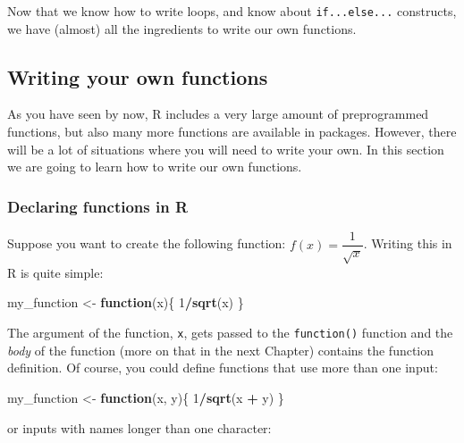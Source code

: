 \documentclass[
]{article}
\newenvironment{Shaded}{\begin{snugshade}}{\end{snugshade}}
\newcommand{\ControlFlowTok}[1]{\textcolor[rgb]{0.13,0.29,0.53}{\textbf{#1}}}
\newcommand{\DecValTok}[1]{\textcolor[rgb]{0.00,0.00,0.81}{#1}}
\newcommand{\KeywordTok}[1]{\textcolor[rgb]{0.13,0.29,0.53}{\textbf{#1}}}
\newcommand{\NormalTok}[1]{#1}
\newcommand{\OperatorTok}[1]{\textcolor[rgb]{0.81,0.36,0.00}{\textbf{#1}}}
\newcommand{\StringTok}[1]{\textcolor[rgb]{0.31,0.60,0.02}{#1}}
\begin{document}
Now that we know how to write loops, and know about \texttt{if...else...} constructs, we have (almost) all
the ingredients to write our own functions.

\hypertarget{writing-your-own-functions}{%
\subsection{Writing your own functions}\label{writing-your-own-functions}}

As you have seen by now, R includes a very large amount of preprogrammed functions, but also many
more functions are available in packages. However, there will be a lot of situations where you will
need to write your own. In this section we are going to learn how to write our own functions.

\hypertarget{declaring-functions-in-r}{%
\subsubsection{Declaring functions in R}\label{declaring-functions-in-r}}

Suppose you want to create the following function: \(f(x) = \dfrac{1}{\sqrt{x}}\).
Writing this in R is quite simple:

\begin{Shaded}
\begin{Highlighting}[]
\NormalTok{my\_function \textless{}{-}}\StringTok{ }\ControlFlowTok{function}\NormalTok{(x)\{}
  \DecValTok{1}\OperatorTok{/}\KeywordTok{sqrt}\NormalTok{(x)}
\NormalTok{\}}
\end{Highlighting}
\end{Shaded}

The argument of the function, \texttt{x}, gets passed to the \texttt{function()} function and the \emph{body} of
the function (more on that in the next Chapter) contains the function definition. Of course,
you could define functions that use more than one input:

\begin{Shaded}
\begin{Highlighting}[]
\NormalTok{my\_function \textless{}{-}}\StringTok{ }\ControlFlowTok{function}\NormalTok{(x, y)\{}
  \DecValTok{1}\OperatorTok{/}\KeywordTok{sqrt}\NormalTok{(x }\OperatorTok{+}\StringTok{ }\NormalTok{y)}
\NormalTok{\}}
\end{Highlighting}
\end{Shaded}

or inputs with names longer than one character:
\end{document}
